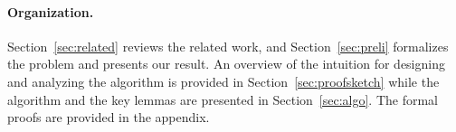 %
%
%
%
%
%
%
%
%


\paragraph{Organization.} 
Section~\ref{sec:related} reviews the related work, and 
Section~\ref{sec:preli} formalizes the problem and presents our result. An overview of the intuition for designing and analyzing the algorithm is provided in Section~\ref{sec:proofsketch} while the algorithm and the key lemmas are presented in Section~\ref{sec:algo}. The formal proofs are provided in the appendix.
